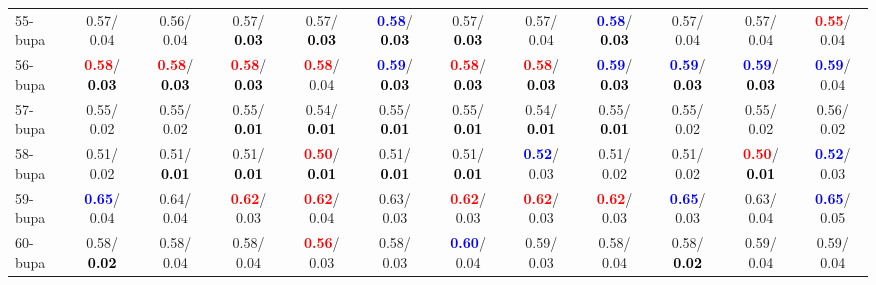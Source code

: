 \begin{table}[h]
\begin{center}
{\begin{tabular}{lc|c|c|c|c|c|c|c|c|c|c}
55-bupa &   0.57/  0.04 &   0.56/  0.04 &   0.57/\textcolor{black}{\textbf{  0.03}} &   0.57/\textcolor{black}{\textbf{  0.03}} & \textcolor{blue}{\textbf{  0.58}}/\textcolor{black}{\textbf{  0.03}} &   0.57/\textcolor{black}{\textbf{  0.03}} &   0.57/  0.04 & \textcolor{blue}{\textbf{  0.58}}/\textcolor{black}{\textbf{  0.03}} &   0.57/  0.04 &   0.57/  0.04 & \textcolor{red}{\textbf{  0.55}}/  0.04 \\
56-bupa & \textcolor{red}{\textbf{  0.58}}/\textcolor{black}{\textbf{  0.03}} & \textcolor{red}{\textbf{  0.58}}/\textcolor{black}{\textbf{  0.03}} & \textcolor{red}{\textbf{  0.58}}/\textcolor{black}{\textbf{  0.03}} & \textcolor{red}{\textbf{  0.58}}/  0.04 & \textcolor{blue}{\textbf{  0.59}}/\textcolor{black}{\textbf{  0.03}} & \textcolor{red}{\textbf{  0.58}}/\textcolor{black}{\textbf{  0.03}} & \textcolor{red}{\textbf{  0.58}}/\textcolor{black}{\textbf{  0.03}} & \textcolor{blue}{\textbf{  0.59}}/\textcolor{black}{\textbf{  0.03}} & \textcolor{blue}{\textbf{  0.59}}/\textcolor{black}{\textbf{  0.03}} & \textcolor{blue}{\textbf{  0.59}}/\textcolor{black}{\textbf{  0.03}} & \textcolor{blue}{\textbf{  0.59}}/  0.04 \\
57-bupa &   0.55/  0.02 &   0.55/  0.02 &   0.55/\textcolor{black}{\textbf{  0.01}} &   0.54/\textcolor{black}{\textbf{  0.01}} &   0.55/\textcolor{black}{\textbf{  0.01}} &   0.55/\textcolor{black}{\textbf{  0.01}} &   0.54/\textcolor{black}{\textbf{  0.01}} &   0.55/\textcolor{black}{\textbf{  0.01}} &   0.55/  0.02 &   0.55/  0.02 &   0.56/  0.02 \\
58-bupa &   0.51/  0.02 &   0.51/\textcolor{black}{\textbf{  0.01}} &   0.51/\textcolor{black}{\textbf{  0.01}} & \textcolor{red}{\textbf{  0.50}}/\textcolor{black}{\textbf{  0.01}} &   0.51/\textcolor{black}{\textbf{  0.01}} &   0.51/\textcolor{black}{\textbf{  0.01}} & \textcolor{blue}{\textbf{  0.52}}/  0.03 &   0.51/  0.02 &   0.51/  0.02 & \textcolor{red}{\textbf{  0.50}}/\textcolor{black}{\textbf{  0.01}} & \textcolor{blue}{\textbf{  0.52}}/  0.03 \\
59-bupa & \textcolor{blue}{\textbf{  0.65}}/  0.04 &   0.64/  0.04 & \textcolor{red}{\textbf{  0.62}}/  0.03 & \textcolor{red}{\textbf{  0.62}}/  0.04 &   0.63/  0.03 & \textcolor{red}{\textbf{  0.62}}/  0.03 & \textcolor{red}{\textbf{  0.62}}/  0.03 & \textcolor{red}{\textbf{  0.62}}/  0.03 & \textcolor{blue}{\textbf{  0.65}}/  0.03 &   0.63/  0.04 & \textcolor{blue}{\textbf{  0.65}}/  0.05 \\
60-bupa &   0.58/\textcolor{black}{\textbf{  0.02}} &   0.58/  0.04 &   0.58/  0.04 & \textcolor{red}{\textbf{  0.56}}/  0.03 &   0.58/  0.03 & \textcolor{blue}{\textbf{  0.60}}/  0.04 &   0.59/  0.03 &   0.58/  0.04 &   0.58/\textcolor{black}{\textbf{  0.02}} &   0.59/  0.04 &   0.59/  0.04 \\ \hline

\end{tabular}}
\end{center}
\end{table}
